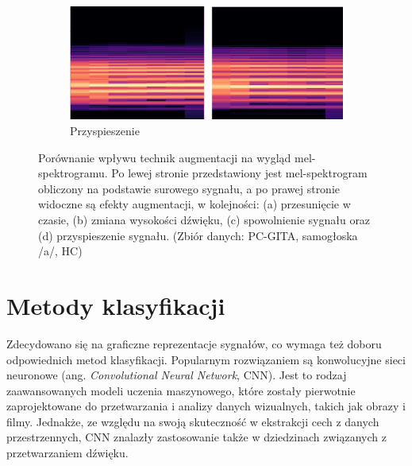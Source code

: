 \begin{figure}[hp]
    \begin{subfigure}{0.68\textwidth}
        \includegraphics[width=\linewidth]{./img/augmentation/speed}
        \caption{Przyspieszenie\@}
        \label{fig:speed}
    \end{subfigure}

    \caption{Porównanie wpływu technik augmentacji na wygląd mel-spektrogramu. Po lewej stronie przedstawiony jest mel-spektrogram obliczony na podstawie surowego sygnału, a po prawej stronie widoczne są efekty augmentacji, w kolejności: (a) przesunięcie w czasie, (b) zmiana wysokości dźwięku, (c) spowolnienie sygnału oraz (d) przyspieszenie sygnału. (Zbiór danych: PC-GITA, samogłoska /a/, HC)}

    \label{fig:augumentacja}
\end{figure}

\section{Metody klasyfikacji}
\label{sec:klasyfikacja}

Zdecydowano się na graficzne reprezentacje sygnałów, co wymaga też doboru odpowiednich metod klasyfikacji.
Popularnym rozwiązaniem są konwolucyjne sieci neuronowe (ang. \emph{Convolutional Neural Network}, CNN).
Jest to rodzaj zaawansowanych modeli uczenia maszynowego, które zostały pierwotnie zaprojektowane do przetwarzania i analizy danych wizualnych, takich jak obrazy i filmy.
Jednakże, ze względu na swoją skuteczność w ekstrakcji cech z danych przestrzennych, CNN znalazły zastosowanie także w dziedzinach związanych z przetwarzaniem dźwięku.

